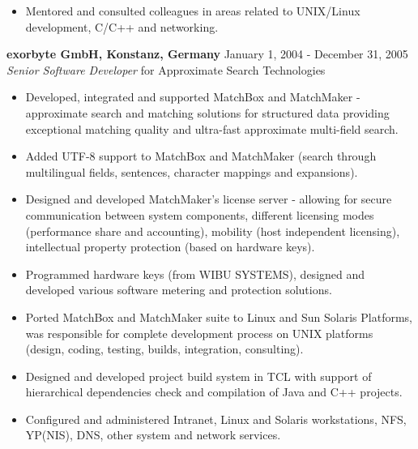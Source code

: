 \documentclass[a4paper,12pt,]{article}
\begin{document}
\begin{description}
\begin{itemize}
    \item Mentored and consulted colleagues in areas related to UNIX/Linux development, C/C++ and networking. 

    \end{itemize}

  \item{\bfseries exorbyte GmbH, Konstanz, Germany} \hfill January 1, 2004 - December 31, 2005 \\ 
    {\em Senior Software Developer} for Approximate Search Technologies
    
    \begin{itemize}
      
    \item Developed, integrated and supported MatchBox and MatchMaker
      - {approximate} search and matching solutions for structured data providing
      exceptional matching quality and ultra-fast approximate multi-field search.
    
    \item Added UTF-8 support to MatchBox and MatchMaker (search through multilingual fields,
      sentences, character mappings and expansions).

    \item Designed and developed MatchMaker's license server - allowing for secure communication
      between system components, different licensing modes (performance share and accounting),
      mobility (host independent licensing), intellectual property protection (based on hardware keys).

    \item Programmed hardware keys (from WIBU SYSTEMS), designed and developed various software metering
      and protection solutions.

    \item Ported MatchBox and MatchMaker suite to Linux and Sun Solaris Platforms, was responsible 
      for complete development process on UNIX platforms (design, coding, testing, builds, integration,
      consulting).

    \item Designed and developed project build system in TCL with support of hierarchical
      dependencies check and compilation of Java and C++ projects. 

    \item Configured and administered Intranet, Linux and Solaris workstations, NFS, YP(NIS), 
      DNS, other system and network services.


\end{itemize}
\end{description}
\end{document}
